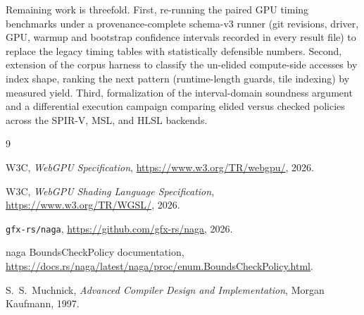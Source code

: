 \documentclass[11pt,a4paper]{article}
\begin{document}
Remaining work is threefold. First, re-running the paired GPU timing
benchmarks under a provenance-complete schema-v3 runner (git revisions,
driver, GPU, warmup and bootstrap confidence intervals recorded in every
result file) to replace the legacy timing tables with statistically
defensible numbers. Second, extension of the corpus harness to classify the
un-elided compute-side accesses by index shape, ranking the next pattern
(runtime-length guards, tile indexing) by measured yield. Third,
formalization of the interval-domain soundness argument and a differential
execution campaign comparing elided versus checked policies across the
SPIR-V, MSL, and HLSL backends.

\footnotesize
\begin{thebibliography}{9}

W3C, \textit{WebGPU Specification},
\url{https://www.w3.org/TR/webgpu/}, 2026.

W3C, \textit{WebGPU Shading Language Specification},
\url{https://www.w3.org/TR/WGSL/}, 2026.

\texttt{gfx-rs/naga}, \url{https://github.com/gfx-rs/naga}, 2026.

naga BoundsCheckPolicy documentation,
\url{https://docs.rs/naga/latest/naga/proc/enum.BoundsCheckPolicy.html}.

S.~S.~Muchnick,
\textit{Advanced Compiler Design and Implementation},
Morgan Kaufmann, 1997.

\end{thebibliography}
\end{document}
